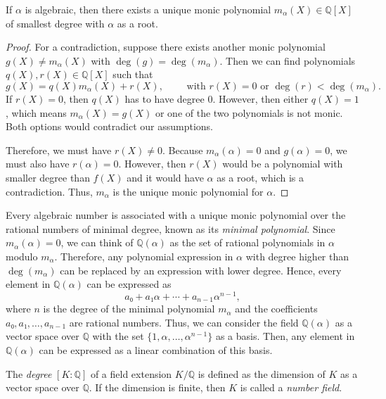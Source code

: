 \begin{lemma}
  If $α$ is algebraic, then there exists a unique monic polynomial $m_α(X) ∈ ℚ[X]$
  of smallest degree with $α$ as a root.
\end{lemma}

\begin{proof}
  For a contradiction, suppose there exists another monic polynomial $g(X) ≠
  m_α(X)$ with $\deg(g) = \deg(m_α)$.
  Then we can find polynomials $q(X), r(X) ∈ ℚ[X]$ such that
  \[
    g(X) = q(X) m_α(X) + r(X), \qquad \text{ with } r(X) = 0 \text{ or } \deg(r) < \deg(m_α).
  \]
  If $r(X) = 0$, then $q(X)$ has to have degree $0$.
  However, then either $q(X) = 1$, which means $m_α(X) = g(X)$ or one of
  the two polynomials is not monic.
  Both options would contradict our assumptions.

  Therefore, we must have $r(X) ≠ 0$.
  Because $m_α(α) = 0$ and $g(α) = 0$, we must also have $r(α) = 0$.
  However, then $r(X)$ would be a polynomial with smaller degree than $f(X)$
  and it would have $α$ as a root, which is a contradiction.
  Thus, $m_α$ is the unique monic polynomial for $α$.
\end{proof}

Every algebraic number is associated with a unique monic polynomial over the rational numbers
of minimal degree, known as its \emph{minimal polynomial}.
Since $m_α(α) = 0$,
we can think of $ℚ(α)$ as the set of rational polynomials in $α$ modulo $m_α$.
Therefore, any polynomial expression in $α$ with degree higher than $\deg(m_α)$
can be replaced by an expression with lower degree.
Hence, every element in $ℚ(α)$ can be expressed as
\[
  a₀ + a₁ α + ⋯ + a_{n-1} α^{n-1},
\]
where $n$ is the degree of the minimal polynomial $m_α$
and the coefficients $a₀, a₁, …, a_{n-1}$ are rational numbers.
Thus,
we can consider the field $ℚ(α)$ as a vector space over $ℚ$
with the set $\{1, α, …, α^{n-1}\}$ as a basis.
Then,
any element in $ℚ(α)$ can be expressed as a linear combination of this basis.

\begin{definition}
  The \emph{degree} $[K : ℚ]$ of a field extension $K/ℚ$ is defined as the
  dimension of $K$ as a vector space over $ℚ$.
  If the dimension is finite, then $K$ is called a \emph{number field}.
\end{definition}

